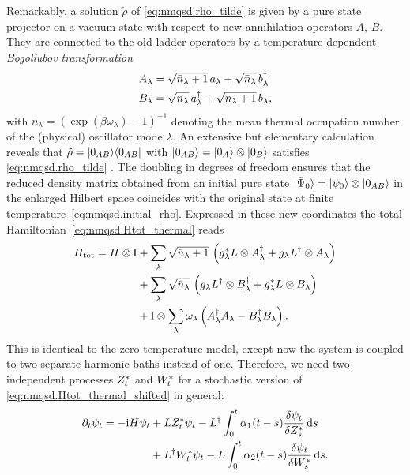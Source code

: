 Remarkably, a solution $\tilde\rho$ of \autoref{eq:nmqsd.rho_tilde} is given by a pure state projector on a vacuum state with respect to new annihilation operators $A$, $B$.
They are connected to the old ladder operators by a temperature dependent \emph{Bogoliubov transformation}
\begin{align*}
  A_\lambda &= \sqrt{\bar n_\lambda + 1} \, a_\lambda + \sqrt{\bar n_\lambda} \, b^\dagger_\lambda \\
  B_\lambda &= \sqrt{\bar n_\lambda} \, a^\dagger_\lambda + \sqrt{\bar n_\lambda + 1} \, b_\lambda,
\end{align*}
with $\bar n_\lambda = \left( \exp(\beta \omega_\lambda) - 1 \right)^{-1}$ denoting the mean thermal occupation number of the (physical) oscillator mode $\lambda$.
An extensive but elementary calculation reveals that $\tilde\rho = | 0_{AB} \rangle\langle 0_{AB} |$ with $| 0_{AB} \rangle = | 0_A \rangle \otimes | 0_B \rangle$ satisfies \autoref{eq:nmqsd.rho_tilde} \cite{SeUm83_thermofield}.
The doubling in degrees of freedom ensures that the reduced density matrix obtained from an initial pure state $| \tilde\Psi_0 \rangle = | \psi_0 \rangle\otimes| 0_{AB} \rangle$ in the enlarged Hilbert space coincides with the original state at finite temperature~\ref{eq:nmqsd.initial_rho}.
Expressed in these new coordinates the total Hamiltonian~\ref{eq:nmqsd.Htot_thermal} reads
\begin{align}
  H_\mathrm{tot} = H\otimes\mathrm{I} &+ \sum_\lambda \sqrt{\bar n_\lambda + 1} \, \left({g}^*_\lambda L\otimes A^\dagger_\lambda + g_\lambda L^\dagger\otimes A_\lambda \right) \nonumber \\
        \label{eq:nmqsd.Htot_thermal_shifted}
        &+ \sum_\lambda \sqrt{\bar n_\lambda} \, \left( g_\lambda L^\dagger\otimes B^\dagger_\lambda  + {g}^*_\lambda L \otimes B_\lambda \right) \\
        &+ \mathrm{I} \otimes \sum_\lambda \omega_\lambda \left( A^\dagger_\lambda A_\lambda - B^\dagger_\lambda B_\lambda \right). \nonumber
\end{align}
This is identical to the zero temperature model, except now the system is coupled to two separate harmonic baths instead of one.
Therefore, we need two independent processes ${Z}^*_t$ and ${W}^*_t$ for a stochastic version of \autoref{eq:nmqsd.Htot_thermal_shifted} in general:
\begin{align}
  \partial_t \psi_t = -\mathrm{i}H\psi_t &+ L{Z}^*_t\psi_t - L^\dagger\int_0^t \alpha_1(t-s) \frac{\delta \psi_t}{\delta {Z}^*_s} \, \mathrm{d} s \nonumber \\
  &+ L^\dagger {W}^*_t \psi_t - L\int_0^t \alpha_2(t-s) \frac{\delta\psi_t}{\delta {W}^*_s} \, \mathrm{d} s.
  \label{eq:nmqsd.nmsse_thermal_2processes}
\end{align}
